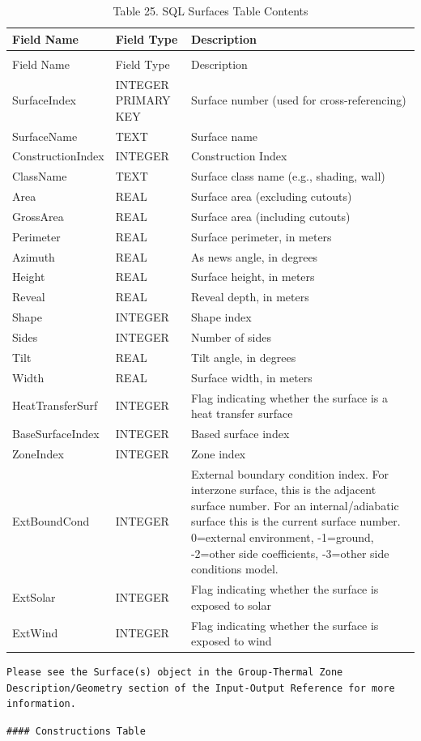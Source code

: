 \begin{longtable}[c]{p{1.5in}p{1.5in}p{3.0in}}
\caption{Table 25. SQL Surfaces Table Contents \label{table:table-25.-sql-surfaces-table-contents}} \tabularnewline
\toprule 
Field Name & Field Type & Description \tabularnewline
\midrule
\endfirsthead

\caption[]{Table 25. SQL Surfaces Table Contents} \tabularnewline
\toprule 
Field Name & Field Type & Description \tabularnewline
\midrule
\endhead

SurfaceIndex & INTEGER PRIMARY KEY & Surface number (used for cross-referencing) \tabularnewline
SurfaceName & TEXT & Surface name \tabularnewline
ConstructionIndex & INTEGER & Construction Index \tabularnewline
ClassName & TEXT & Surface class name (e.g., shading, wall) \tabularnewline
Area & REAL & Surface area (excluding cutouts) \tabularnewline
GrossArea & REAL & Surface area (including cutouts) \tabularnewline
Perimeter & REAL & Surface perimeter, in meters \tabularnewline
Azimuth & REAL & As news angle, in degrees \tabularnewline
Height & REAL & Surface height, in meters \tabularnewline
Reveal & REAL & Reveal depth, in meters \tabularnewline
Shape & INTEGER & Shape index \tabularnewline
Sides & INTEGER & Number of sides \tabularnewline
Tilt & REAL & Tilt angle, in degrees \tabularnewline
Width & REAL & Surface width, in meters \tabularnewline
HeatTransferSurf & INTEGER & Flag indicating whether the surface is a heat transfer surface \tabularnewline
BaseSurfaceIndex & INTEGER & Based surface index \tabularnewline
ZoneIndex & INTEGER & Zone index \tabularnewline
ExtBoundCond & INTEGER & External boundary condition index. For interzone surface, this is the adjacent surface number. For an internal/adiabatic surface this is the current surface number. 0=external environment, -1=ground, -2=other side coefficients, -3=other side conditions model. \tabularnewline
ExtSolar & INTEGER & Flag indicating whether the surface is exposed to solar \tabularnewline
ExtWind & INTEGER & Flag indicating whether the surface is exposed to wind \tabularnewline
\bottomrule
\end{longtable}

\begin{lstlisting}
Please see the Surface(s) object in the Group-Thermal Zone Description/Geometry section of the Input-Output Reference for more information.
\end{lstlisting}

\begin{lstlisting}
#### Constructions Table
\end{lstlisting}

